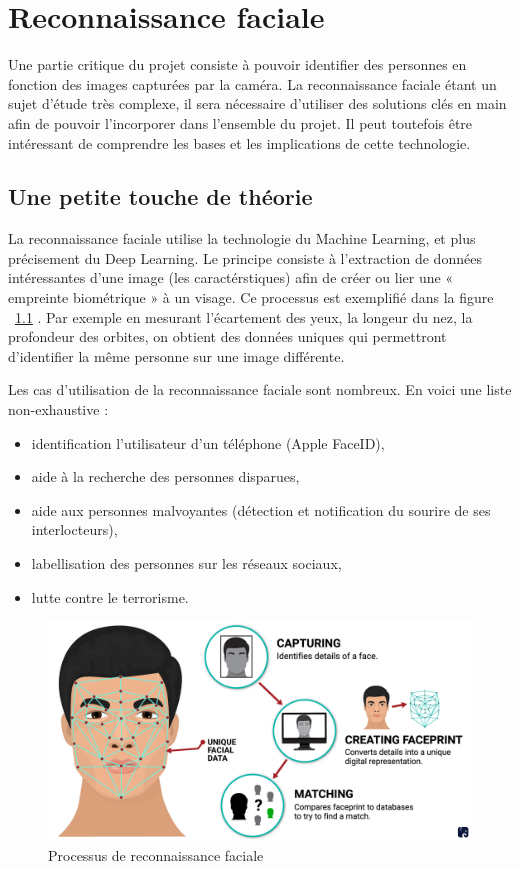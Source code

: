 \chapter{Reconnaissance faciale}
\label{ch:reco_faciale}

Une partie critique du projet consiste à pouvoir identifier des personnes en fonction des images capturées par la
caméra. La reconnaissance faciale étant un sujet d’étude très complexe, il sera nécessaire d’utiliser des solutions
clés en main afin de pouvoir l’incorporer dans l’ensemble du projet. Il peut toutefois être intéressant de
comprendre les bases et les implications de cette technologie.

\section{Une petite touche de théorie}
La reconnaissance faciale utilise la technologie du Machine Learning, et plus précisement du Deep Learning.
Le principe consiste à l’extraction de données intéressantes d’une image (les caractérstiques) afin de créer ou lier une
« empreinte biométrique » à un visage. Ce processus est exemplifié dans la figure ~\ref{fig:reco-process} . Par exemple en mesurant l’écartement des yeux, la longeur du nez, la
profondeur des orbites, on obtient des données uniques qui permettront d’identifier la même personne sur une
image différente.

Les cas d’utilisation de la reconnaissance faciale sont nombreux.
En voici une liste non-exhaustive :
\begin{itemize}
\item identification l’utilisateur d’un téléphone (Apple FaceID),
\item aide à la recherche des personnes disparues,
\item aide aux personnes malvoyantes (détection et notification du sourire de ses interlocteurs),
\item labellisation des personnes sur les réseaux sociaux,
\item lutte contre le terrorisme.
\end{itemize}

\begin{figure}[H]
	\centering
	\includegraphics[width=12cm]{images/proto-5.png}
	\caption{Processus de reconnaissance faciale}
	\label{fig:reco-process}
\end{figure}

